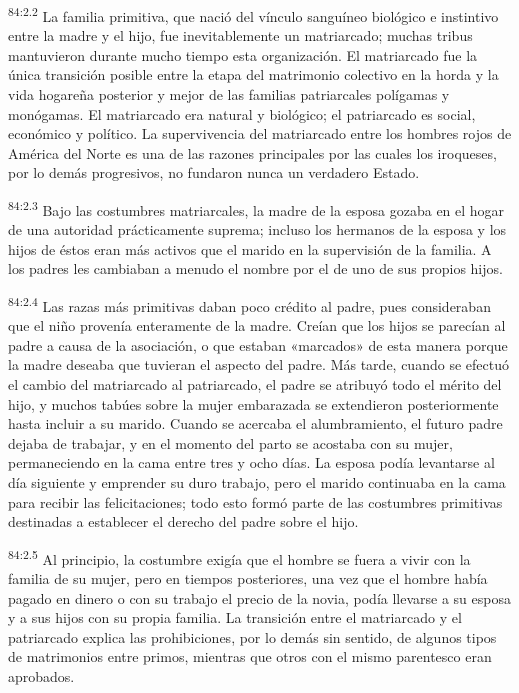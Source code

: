 \par
\textsuperscript{84:2.2} La familia primitiva, que nació del vínculo sanguíneo biológico e instintivo entre la madre y el hijo, fue inevitablemente un matriarcado; muchas tribus mantuvieron durante mucho tiempo esta organización. El matriarcado fue la única transición posible entre la etapa del matrimonio colectivo en la horda y la vida hogareña posterior y mejor de las familias patriarcales polígamas y monógamas. El matriarcado era natural y biológico; el patriarcado es social, económico y político. La supervivencia del matriarcado entre los hombres rojos de América del Norte es una de las razones principales por las cuales los iroqueses, por lo demás progresivos, no fundaron nunca un verdadero Estado.

\par
\textsuperscript{84:2.3} Bajo las costumbres matriarcales, la madre de la esposa gozaba en el hogar de una autoridad prácticamente suprema; incluso los hermanos de la esposa y los hijos de éstos eran más activos que el marido en la supervisión de la familia. A los padres les cambiaban a menudo el nombre por el de uno de sus propios hijos.

\par
\textsuperscript{84:2.4} Las razas más primitivas daban poco crédito al padre, pues consideraban que el niño provenía enteramente de la madre. Creían que los hijos se parecían al padre a causa de la asociación, o que estaban «marcados» de esta manera porque la madre deseaba que tuvieran el aspecto del padre. Más tarde, cuando se efectuó el cambio del matriarcado al patriarcado, el padre se atribuyó todo el mérito del hijo, y muchos tabúes sobre la mujer embarazada se extendieron posteriormente hasta incluir a su marido. Cuando se acercaba el alumbramiento, el futuro padre dejaba de trabajar, y en el momento del parto se acostaba con su mujer, permaneciendo en la cama entre tres y ocho días. La esposa podía levantarse al día siguiente y emprender su duro trabajo, pero el marido continuaba en la cama para recibir las felicitaciones; todo esto formó parte de las costumbres primitivas destinadas a establecer el derecho del padre sobre el hijo.

\par
\textsuperscript{84:2.5} Al principio, la costumbre exigía que el hombre se fuera a vivir con la familia de su mujer, pero en tiempos posteriores, una vez que el hombre había pagado en dinero o con su trabajo el precio de la novia, podía llevarse a su esposa y a sus hijos con su propia familia. La transición entre el matriarcado y el patriarcado explica las prohibiciones, por lo demás sin sentido, de algunos tipos de matrimonios entre primos, mientras que otros con el mismo parentesco eran aprobados.

